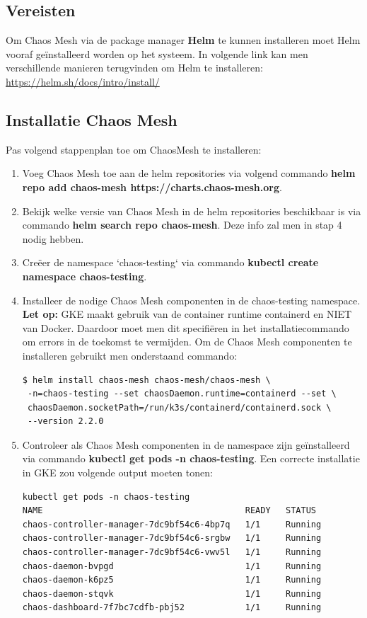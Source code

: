 \subsection {Vereisten}

Om Chaos Mesh via de package manager {\bf Helm} te kunnen installeren moet Helm vooraf geïnstalleerd worden op het systeem. In volgende link kan men verschillende manieren terugvinden om Helm te installeren: \url{https://helm.sh/docs/intro/install/}

\subsection{Installatie Chaos Mesh}

Pas volgend stappenplan toe om ChaosMesh te installeren:
\begin{enumerate}
    \item Voeg Chaos Mesh toe aan de helm repositories via volgend commando {\bf helm repo add chaos-mesh https://charts.chaos-mesh.org}.
    \item Bekijk welke versie van Chaos Mesh in de helm repositories beschikbaar is via commando {\bf helm search repo chaos-mesh}. Deze info zal men in stap 4 nodig hebben.
    \item Creëer de namespace `chaos-testing` via commando {\bf kubectl create namespace chaos-testing}.
    \item Installeer de nodige Chaos Mesh componenten in de chaos-testing namespace. {\bf Let op:} GKE maakt gebruik van de container runtime containerd en NIET van Docker. Daardoor moet men dit specifiëren in het installatiecommando om errors in de toekomst te vermijden. Om de Chaos Mesh componenten te installeren gebruikt men onderstaand commando:
\begin{lstlisting}
$ helm install chaos-mesh chaos-mesh/chaos-mesh \
 -n=chaos-testing --set chaosDaemon.runtime=containerd --set \
 chaosDaemon.socketPath=/run/k3s/containerd/containerd.sock \
 --version 2.2.0    
\end{lstlisting}
    \item Controleer als Chaos Mesh componenten in de namespace zijn geïnstalleerd via commando {\bf kubectl get pods -n chaos-testing}. Een correcte installatie in GKE zou volgende output moeten tonen: 
\begin{lstlisting}  
kubectl get pods -n chaos-testing
NAME                                        READY   STATUS   
chaos-controller-manager-7dc9bf54c6-4bp7q   1/1     Running
chaos-controller-manager-7dc9bf54c6-srgbw   1/1     Running
chaos-controller-manager-7dc9bf54c6-vwv5l   1/1     Running
chaos-daemon-bvpgd                          1/1     Running
chaos-daemon-k6pz5                          1/1     Running
chaos-daemon-stqvk                          1/1     Running
chaos-dashboard-7f7bc7cdfb-pbj52            1/1     Running   
\end{lstlisting}  
\end{enumerate}

